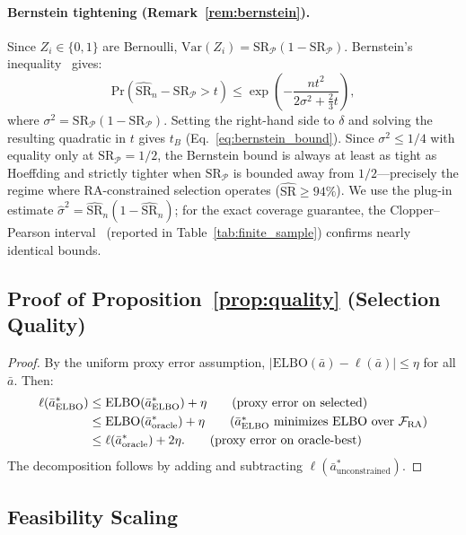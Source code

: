 \documentclass{article}
\renewcommand{\Pr}{\mathrm{Pr}}
\newcommand{\ba}{\bar{a}}
\newcommand{\cF}{\mathcal{F}}
\newcommand{\cP}{\mathcal{P}}
\newcommand{\Var}{\mathrm{Var}}
\begin{document}
\paragraph{Bernstein tightening (Remark~\ref{rem:bernstein}).} Since $Z_i \in \{0,1\}$ are Bernoulli, $\Var(Z_i) = \mathrm{SR}_\cP(1 - \mathrm{SR}_\cP)$. Bernstein's inequality~\citep{boucheron2013concentration} gives:
\[
\Pr\!\left(\widehat{\mathrm{SR}}_n - \mathrm{SR}_\cP > t\right) \leq \exp\!\left(-\frac{nt^2}{2\sigma^2 + \frac{2}{3}t}\right),
\]
where $\sigma^2 = \mathrm{SR}_\cP(1-\mathrm{SR}_\cP)$. Setting the right-hand side to $\delta$ and solving the resulting quadratic in $t$ gives $t_B$ (Eq.~\eqref{eq:bernstein_bound}). Since $\sigma^2 \leq 1/4$ with equality only at $\mathrm{SR}_\cP = 1/2$, the Bernstein bound is always at least as tight as Hoeffding and strictly tighter when $\mathrm{SR}_\cP$ is bounded away from $1/2$---precisely the regime where RA-constrained selection operates ($\widehat{\mathrm{SR}} \geq 94\%$). We use the plug-in estimate $\hat{\sigma}^2 = \widehat{\mathrm{SR}}_n(1 - \widehat{\mathrm{SR}}_n)$; for the exact coverage guarantee, the Clopper--Pearson interval~\citep{clopper1934use} (reported in Table~\ref{tab:finite_sample}) confirms nearly identical bounds.

\subsection{Proof of Proposition~\ref{prop:quality} (Selection Quality)}

\begin{proof}
By the uniform proxy error assumption, $|\mathrm{ELBO}(\ba) - \ell(\ba)| \leq \eta$ for all $\ba$. Then:
\begin{align}
\ell(\ba^*_{\mathrm{ELBO}}) &\leq \mathrm{ELBO}(\ba^*_{\mathrm{ELBO}}) + \eta \tag{proxy error on selected} \\
&\leq \mathrm{ELBO}(\ba^*_{\mathrm{oracle}}) + \eta \tag{$\ba^*_{\mathrm{ELBO}}$ minimizes ELBO over $\cF_{\mathrm{RA}}$} \\
&\leq \ell(\ba^*_{\mathrm{oracle}}) + 2\eta. \tag{proxy error on oracle-best}
\end{align}
The decomposition follows by adding and subtracting $\ell(\ba^*_{\mathrm{unconstrained}})$.
\end{proof}

\subsection{Feasibility Scaling}
\end{document}
